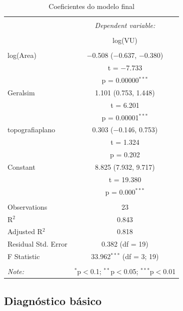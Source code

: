 \documentclass[]{article}
\begin{document}
\begin{table}[!htbp] \centering 
  \caption{Coeficientes do modelo final} 
  \label{tab:fit} 
\begin{tabular}{@{\extracolsep{5pt}}lc} 
\\[-1.8ex]\hline 
\hline \\[-1.8ex] 
 & \multicolumn{1}{c}{\textit{Dependent variable:}} \\ 
\cline{2-2} 
\\[-1.8ex] & log(VU) \\ 
\hline \\[-1.8ex] 
 log(Area) & $-$0.508 ($-$0.637, $-$0.380) \\ 
  & t = $-$7.733 \\ 
  & p = 0.00000$^{***}$ \\ 
  Geralsim & 1.101 (0.753, 1.448) \\ 
  & t = 6.201 \\ 
  & p = 0.00001$^{***}$ \\ 
  topografiaplano & 0.303 ($-$0.146, 0.753) \\ 
  & t = 1.324 \\ 
  & p = 0.202 \\ 
  Constant & 8.825 (7.932, 9.717) \\ 
  & t = 19.380 \\ 
  & p = 0.000$^{***}$ \\ 
 \hline \\[-1.8ex] 
Observations & 23 \\ 
R$^{2}$ & 0.843 \\ 
Adjusted R$^{2}$ & 0.818 \\ 
Residual Std. Error & 0.382 (df = 19) \\ 
F Statistic & 33.962$^{***}$ (df = 3; 19) \\ 
\hline 
\hline \\[-1.8ex] 
\textit{Note:}  & \multicolumn{1}{r}{$^{*}$p$<$0.1; $^{**}$p$<$0.05; $^{***}$p$<$0.01} \\ 
\end{tabular} 
\end{table}

\subsection{Diagnóstico básico}\label{diagnostico-basico}
\end{document}
